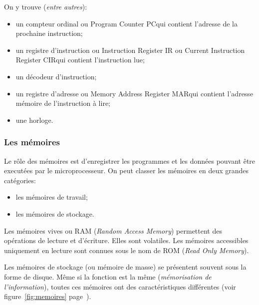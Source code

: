 \documentclass[11pt,french]{article}
\providecommand{\tightlist}{%
      \setlength{\itemsep}{0pt}\setlength{\parskip}{0pt}}
\begin{document}
On y trouve (\textit{entre autres}):

\begin{itemize}
\tightlist
\item
  un compteur ordinal ou \og Program Counter PC\fg  qui contient l'adresse
  de la prochaine instruction;
\item
  un registre d'instruction  ou \og Instruction Register IR  ou Current Instruction
  Register CIR\fg qui contient l'instruction lue;
\item
  un décodeur d'instruction;
\item
  un registre d'adresse ou \og Memory Address Register MAR\fg qui contient
  l'adresse mémoire de l'instruction à lire;
\item   une horloge.
\end{itemize}

\hypertarget{les-memoires}{%
\subsubsection{Les mémoires}\label{les-memoires}}
Le rôle des mémoires est d'enregistrer les programmes et les données pouvant être executées par le microprocesseur. On peut classer les mémoires en deux grandes catégories:
\begin{itemize}
    \item les mémoires de travail;
    \item les mémoires de stockage.
\end{itemize}
Les mémoires vives ou RAM (\textit{Random Access Memory}) permettent des opérations de lecture et d'écriture. Elles sont volatiles. Les mémoires accessibles uniquement en lecture sont connues sous le nom de ROM (\textit{Read Only Memory}).

Les mémoires de stockage (ou mémoire de masse) se présentent souvent sous la forme de disque.
Même si la fonction est la même (\textit{mémorisation de l'information}), toutes ces mémoires ont des caractéristiques différentes (voir figure~\ref{fig:memoires} page~\pageref{fig:memoires}).
\end{document}
